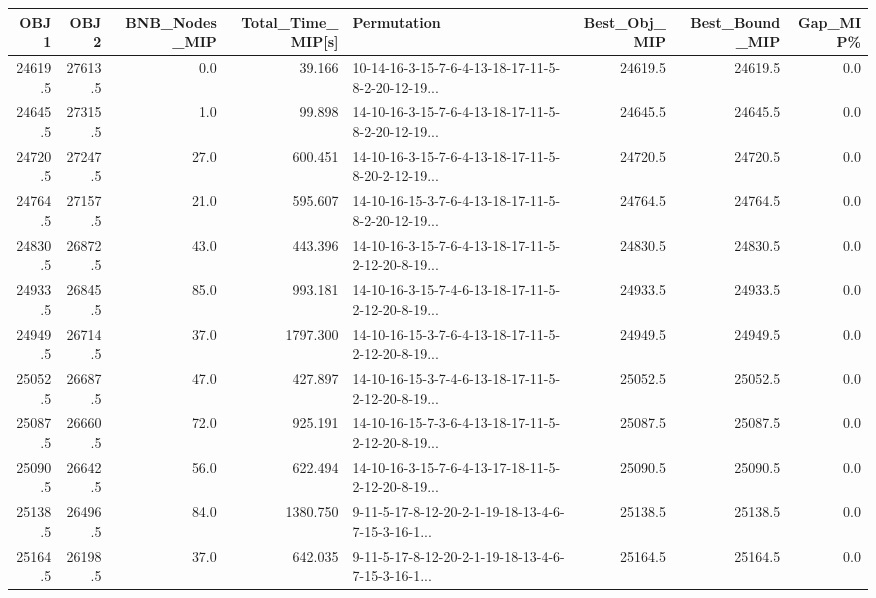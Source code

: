 \begin{tabular}{rrrrlrrr}
\toprule
    OBJ1 &     OBJ2 &  BNB\_Nodes\_MIP &  Total\_Time\_MIP[s] &                                        Permutation &  Best\_Obj\_MIP &  Best\_Bound\_MIP &  Gap\_MIP\% \\
\midrule
 24619.5 &  27613.5 &            0.0 &             39.166 &  10-14-16-3-15-7-6-4-13-18-17-11-5-8-2-20-12-19... &       24619.5 &         24619.5 &       0.0 \\
 24645.5 &  27315.5 &            1.0 &             99.898 &  14-10-16-3-15-7-6-4-13-18-17-11-5-8-2-20-12-19... &       24645.5 &         24645.5 &       0.0 \\
 24720.5 &  27247.5 &           27.0 &            600.451 &  14-10-16-3-15-7-6-4-13-18-17-11-5-8-20-2-12-19... &       24720.5 &         24720.5 &       0.0 \\
 24764.5 &  27157.5 &           21.0 &            595.607 &  14-10-16-15-3-7-6-4-13-18-17-11-5-8-2-20-12-19... &       24764.5 &         24764.5 &       0.0 \\
 24830.5 &  26872.5 &           43.0 &            443.396 &  14-10-16-3-15-7-6-4-13-18-17-11-5-2-12-20-8-19... &       24830.5 &         24830.5 &       0.0 \\
 24933.5 &  26845.5 &           85.0 &            993.181 &  14-10-16-3-15-7-4-6-13-18-17-11-5-2-12-20-8-19... &       24933.5 &         24933.5 &       0.0 \\
 24949.5 &  26714.5 &           37.0 &           1797.300 &  14-10-16-15-3-7-6-4-13-18-17-11-5-2-12-20-8-19... &       24949.5 &         24949.5 &       0.0 \\
 25052.5 &  26687.5 &           47.0 &            427.897 &  14-10-16-15-3-7-4-6-13-18-17-11-5-2-12-20-8-19... &       25052.5 &         25052.5 &       0.0 \\
 25087.5 &  26660.5 &           72.0 &            925.191 &  14-10-16-15-7-3-6-4-13-18-17-11-5-2-12-20-8-19... &       25087.5 &         25087.5 &       0.0 \\
 25090.5 &  26642.5 &           56.0 &            622.494 &  14-10-16-3-15-7-6-4-13-17-18-11-5-2-12-20-8-19... &       25090.5 &         25090.5 &       0.0 \\
 25138.5 &  26496.5 &           84.0 &           1380.750 &  9-11-5-17-8-12-20-2-1-19-18-13-4-6-7-15-3-16-1... &       25138.5 &         25138.5 &       0.0 \\
 25164.5 &  26198.5 &           37.0 &            642.035 &  9-11-5-17-8-12-20-2-1-19-18-13-4-6-7-15-3-16-1... &       25164.5 &         25164.5 &       0.0 \\

\end{tabular}
